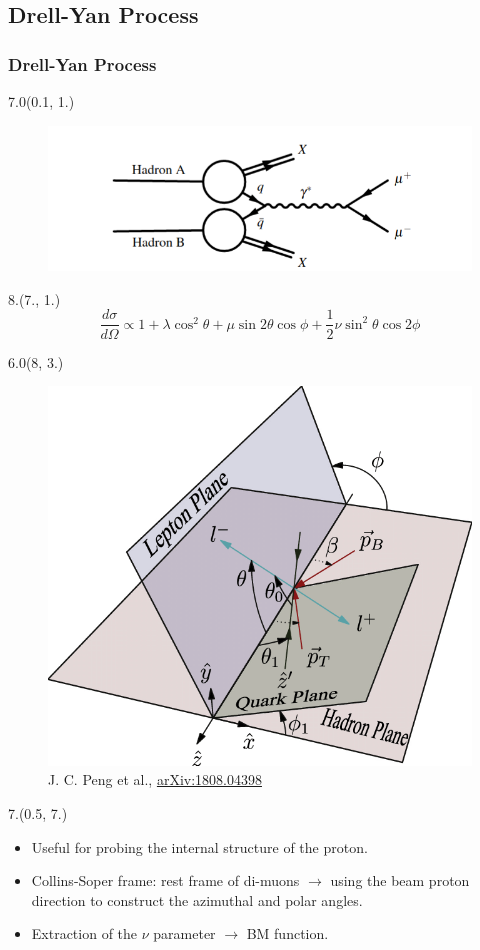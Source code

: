 \documentclass[12pt, xcolor={dvipsnames}, aspectratio = 169, sans, mathserif]{beamer}
\newenvironment{List}[2]
{\begin{textblock}{#1}#2
\begin{itemize}}
{\end{itemize}
\end{textblock}}
\newenvironment{Pic}[2]
{\begin{textblock}{#1}#2
\begin{figure}}
{\end{figure}
\end{textblock}}
\newcommand{\NewCaption}[3]{\caption{{#1}, \textcolor{blue}{\href{#2}{#3}}}}
\begin{document}
\subsection{Drell-Yan Process}
\begin{frame}
\frametitle{Drell-Yan Process}

\begin{Pic}{7.0}{(0.1, 1.)}
  \includegraphics[width=7.cm]{imgs/drell-yan.png}
\end{Pic}

\begin{textblock}{8.}(7., 1.)
\begin{equation*}
\frac{d\sigma}{d\Omega} \propto 1  + \lambda \cos^{2}\theta + \mu \sin 2 \theta \cos \phi + \frac{1}{2}\nu \sin^{2}\theta \cos 2 \phi
\end{equation*}
\end{textblock}

\begin{Pic}{6.0}{(8, 3.)}
  \NewCaption{J. C. Peng et al.}{https://arxiv.org/abs/1808.04398}{arXiv:1808.04398}
  \includegraphics[width=6.cm]{imgs/three_plane_newest.png}
\end{Pic}

\begin{List}{7.}{(0.5, 7.)}

  \item Useful for probing the internal structure of the proton.

  \item Collins-Soper frame: rest frame of di-muons $\rightarrow$ using the beam proton direction to construct the azimuthal and polar angles.

  \item Extraction of the $\nu$ parameter $\rightarrow$ BM function.

\end{List}
\end{frame}
\end{document}
